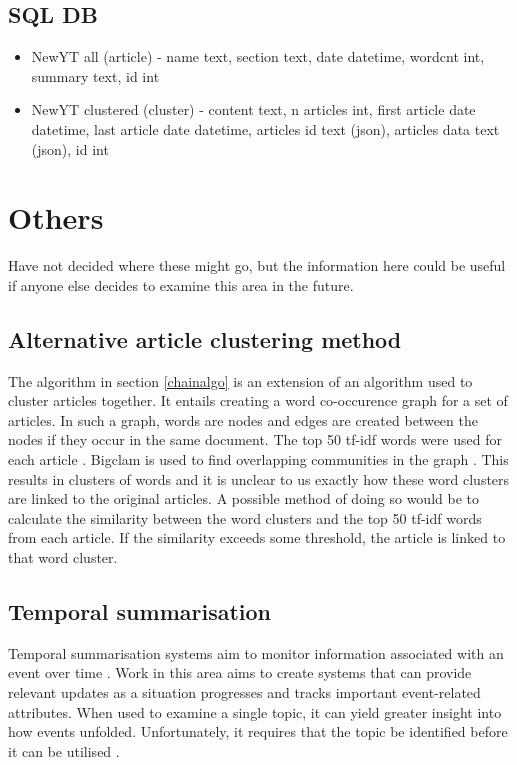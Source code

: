 \documentclass[12pt]{article}
\begin{document}
\subsection{SQL DB}
\begin{itemize}[noitemsep]
\item{NewYT all (article) - name text, section text, date datetime, wordcnt int, summary text, id int }
\item{NewYT clustered (cluster) - content text, n articles int, first article date datetime, last article date datetime, articles id text (json), articles data text (json), id int}
\end{itemize}

\section{Others}
Have not decided where these might go, but the information here could be useful if anyone else decides to examine this area in the future.

\subsection{Alternative article clustering method}
The algorithm in section \ref{chainalgo} is an extension of an algorithm used to cluster articles together. It entails creating a word co-occurence graph for a set of articles. In such a graph, words are nodes and edges are created between the nodes if they occur in the same document. The top 50 tf-idf words were used for each article \cite{infocartography}. Bigclam is used to find overlapping communities in the graph \cite{overlapcom}. This results in clusters of words and it is unclear to us exactly how these word clusters are linked to the original articles. A possible method of doing so would be to calculate the similarity between the word clusters and the top 50 tf-idf words from each article. If the similarity exceeds some threshold, the article is linked to that word cluster.

\subsection{Temporal summarisation}
Temporal summarisation systems aim to monitor information associated with an event over time \cite{trects2014}. Work in this area aims to create systems that can provide relevant updates as a situation progresses and tracks important event-related attributes. When used to examine a single topic, it can yield greater insight into how events unfolded. Unfortunately, it requires that the topic be identified before it can be utilised \cite{temporalsum}.
\end{document}
